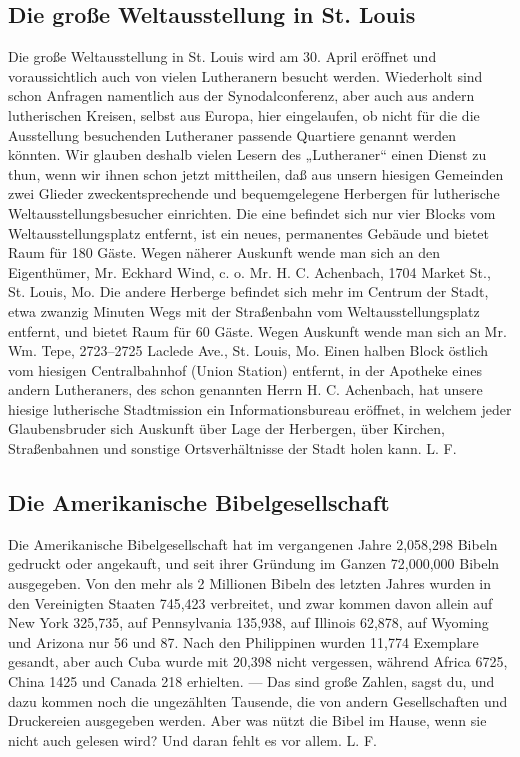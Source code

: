 \subsection[Die große Weltausstellung]{Die große Weltausstellung in St. Louis}
Die große Weltausstellung in St. Louis wird am 30. April eröffnet und voraussichtlich auch von vielen Lutheranern besucht werden. Wiederholt sind schon Anfragen namentlich aus der Synodalconferenz, aber auch aus andern lutherischen Kreisen, selbst aus Europa, hier eingelaufen, ob nicht für die die Ausstellung besuchenden Lutheraner passende Quartiere genannt werden könnten. Wir glauben deshalb vielen Lesern des „Lutheraner“ einen Dienst zu thun, wenn wir ihnen schon jetzt mittheilen, daß aus unsern hiesigen Gemeinden zwei Glieder zweckentsprechende und bequemgelegene Herbergen für lutherische Weltausstellungsbesucher einrichten. Die eine befindet sich nur vier Blocks vom Weltausstellungsplatz entfernt, ist ein neues, permanentes Gebäude und bietet Raum für 180 Gäste. Wegen näherer Auskunft wende man sich an den Eigenthümer, Mr. Eckhard Wind, c. o. Mr. H. C. Achenbach, 1704 Market St., St. Louis, Mo. Die andere Herberge befindet sich mehr im Centrum der Stadt, etwa zwanzig Minuten Wegs mit der Straßenbahn vom Weltausstellungsplatz entfernt, und bietet Raum für 60 Gäste. Wegen Auskunft wende man sich an Mr. Wm. Tepe, 2723–2725 Laclede Ave., St. Louis, Mo. Einen halben Block östlich vom hiesigen Centralbahnhof (Union Station) entfernt, in der Apotheke eines andern Lutheraners, des schon genannten Herrn H. C. Achenbach, hat unsere hiesige lutherische Stadtmission ein Informationsbureau eröffnet, in welchem jeder Glaubensbruder sich Auskunft über Lage der Herbergen, über Kirchen, Straßenbahnen und sonstige Ortsverhältnisse der Stadt holen kann. L. F.

\subsection{Die Amerikanische Bibelgesellschaft}
Die Amerikanische Bibelgesellschaft hat im vergangenen Jahre 2,058,298 Bibeln gedruckt oder angekauft, und seit ihrer Gründung im Ganzen 72,000,000 Bibeln ausgegeben. Von den mehr als 2 Millionen Bibeln des letzten Jahres wurden in den Vereinigten Staaten 745,423 verbreitet, und zwar kommen davon allein auf New York 325,735, auf Pennsylvania 135,938, auf Illinois 62,878, auf Wyoming und Arizona nur 56 und 87. Nach den Philippinen wurden 11,774 Exemplare gesandt, aber auch Cuba wurde mit 20,398 nicht vergessen, während Africa 6725, China 1425 und Canada 218 erhielten. — Das sind große Zahlen, sagst du, und dazu kommen noch die ungezählten Tausende, die von andern Gesellschaften und Druckereien ausgegeben werden. Aber was nützt die Bibel im Hause, wenn sie nicht auch gelesen wird? Und daran fehlt es vor allem. L. F.

